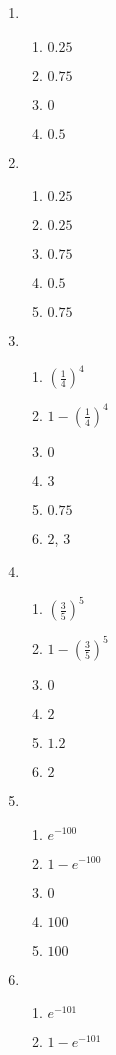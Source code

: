 \begin{multicols}{2}
\begin{enumerate}
	\item
			\begin{enumerate}
				\item $0.25$
				\item $0.75$
				\item $0$
				\item $0.5$
			\end{enumerate}
	\item
			\begin{enumerate}
				\item $0.25$
				\item $0.25$
				\item $0.75$
				\item $0.5$
				\item $0.75$
			\end{enumerate}
	\item
			\begin{enumerate}
				\item $\left( \frac{1}{4} \right) ^4$
				\item $1 - \left( \frac{1}{4} \right) ^4$
				\item $0$
				\item $3$
				\item $0.75$
				\item $2$, $3$
			\end{enumerate}
	\item
			\begin{enumerate}
				\item $\left( \frac{3}{5} \right) ^5$
				\item $1 - \left( \frac{3}{5} \right) ^5$
				\item $0$
				\item $2$
				\item $1.2$
				\item $2$
			\end{enumerate}
	\item
			\begin{enumerate}
				\item $e^{-100}$
				\item $1 - e^{-100}$
				\item $0$
				\item $100$
				\item $100$
			\end{enumerate}
	\item
			\begin{enumerate}
				\item $e^{-101}$
				\item $1 - e^{-101}$

\end{enumerate}
\end{enumerate}
\end{multicols}
